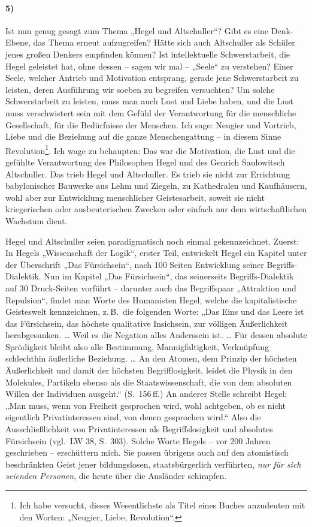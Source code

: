 \documentclass[12pt,a4paper]{article}
\begin{document}
\paragraph{5)} 
Ist nun genug gesagt zum Thema „Hegel und Altschuller“? Gibt es eine
Denk-Ebene, das Thema erneut aufzugreifen? Hätte sich auch Altschuller als
Schüler jenes großen Denkers empfinden können? Ist intellektuelle
Schwerstarbeit, die Hegel geleistet hat, ohne dessen – sagen wir mal – „Seele“
zu verstehen? Einer Seele, welcher Antrieb und Motivation entsprang, gerade
jene Schwerstarbeit zu leisten, deren Ausführung wir soeben zu begreifen
versuchten? Um solche Schwerstarbeit zu leisten, muss man auch Lust und Liebe
haben, und die Lust muss verschwistert sein mit dem Gefühl der Verantwortung
für die menschliche Gesellschaft, für die Bedürfnisse der Menschen. Ich sage:
Neugier und Vortrieb, Liebe und die Beziehung auf die ganze Menschengattung –
in diesem Sinne Revolution\footnote{Ich habe versucht, dieses Wesentlichste als
  Titel eines Buches anzudeuten mit den Worten: „Neugier, Liebe,
  Revolution“.}. Ich wage zu behaupten: Das war die Motivation, die Lust und
die gefühlte Verantwortung des Philosophen Hegel und des Genrich Saulowitsch
Altschuller. Das trieb Hegel und Altschuller. Es trieb sie nicht zur Errichtung
babylonischer Bauwerke aus Lehm und Ziegeln, zu Kathedralen und Kaufhäusern,
wohl aber zur Entwicklung menschlicher Geistesarbeit, soweit sie nicht
kriegerischen oder ausbeuterischen Zwecken oder einfach nur dem
wirtschaftlichen Wachstum dient.

Hegel und Altschuller seien paradigmatisch noch einmal gekennzeichnet. Zuerst:
In Hegels „Wissenschaft der Logik“, erster Teil, entwickelt Hegel ein Kapitel
unter der Überschrift „Das Fürsichsein“, nach 100 Seiten Entwicklung seiner
Begriffs-Dialektik. Nun im Kapitel „Das Fürsichsein“, das seinerseits
Begriffs-Dialektik auf 30 Druck-Seiten vorführt – darunter auch das
Begriffspaar „Attraktion und Repulsion“, findet man Worte des Humanisten Hegel,
welche die kapitalistische Geisteswelt kennzeichnen, z.\,B.\ die folgenden
Worte: „Das Eins und das Leere ist das Fürsichsein, das höchste qualitative
Insichsein, zur völligen Äußerlichkeit herabgesunken. … Weil es die Negation
alles Anderssein ist. … Für dessen absolute Sprödigkeit bleibt also alle
Bestimmung, Mannigfaltigkeit, Verknüpfung schlechthin äußerliche Beziehung. …
An den Atomen, dem Prinzip der höchsten Äußerlichkeit und damit der höchsten
Begrifflosigkeit, leidet die Physik in den Molekules, Partikeln ebenso als die
Staatswissenschaft, die von dem absoluten Willen der Individuen ausgeht.“
(S.~156\,ff.) An anderer Stelle schreibt Hegel: „Man muss, wenn von Freiheit
gesprochen wird, wohl achtgeben, ob es nicht eigentlich Privatinteressen sind,
von denen gesprochen wird.“ Also die Ausschließlichkeit von Privatinteressen
als Begriffslosigkeit und absolutes Fürsichsein (vgl.\ LW 38, S.~303). Solche
Worte Hegels – vor 200 Jahren geschrieben – erschüttern mich. Sie passen
übrigens auch auf den atomistisch beschränkten Geist jener bildungslosen,
staatsbürgerlich verführten, \emph{nur für sich seienden Personen}, die heute
über die Ausländer schimpfen.
\end{document}
